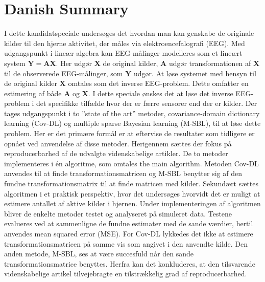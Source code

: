 \chapter*{Danish Summary}
I dette kandidatspeciale undersøges det hvordan man kan genskabe de originale kilder til den hjerne aktivitet, der måles via elektroencefalografi (EEG). Med udgangspunkt i lineær algebra kan EEG-målinger modelleres som et lineært system $\mathbf{Y}=\mathbf{AX}$. 
Her udgør $\mathbf{X}$ de original kilder, $\mathbf{A}$ udgør transformationen af $\mathbf{X}$ til de observerede EEG-målinger, som $\mathbf{Y}$ udgør.   
At løse systemet med hensyn til de original kilder $\mathbf{X}$ omtales som det inverse EEG-problem. 
Dette omfatter en estimering af både $\mathbf{A}$ og $\mathbf{X}$.
I dette speciale ønskes det at løse det inverse EEG-problem i det specifikke tilfælde hvor der er færre sensorer end der er kilder.  
Der tages udgangspunkt i to ”state of the art” metoder, covariance-domain dictionary learning (Cov-DL) og multiple sparse Bayesian learning (M-SBL), til at løse dette problem. 
Her er det primære formål er at eftervise de resultater som tidligere er opnået ved anvendelse af disse metoder. Herigennem sættes der fokus på reproducerbarhed af de udvalgte videnskabelige artikler.  
De to metoder implementeres i én algoritme, som omtales the main algorithm. 
Metoden Cov-DL anvendes til at finde transformationsmatricen og M-SBL benytter sig af den fundne transformationsmatrix til at finde matricen med kilder. 
Sekundært sættes algoritmen i et praktisk perspektiv, hvor det undersøges hvorvidt det er muligt at estimere antallet af aktive kilder i hjernen.
Under implementeringen af algoritmen bliver de enkelte metoder testet og analyseret på simuleret data. 
Testene evalueres ved at sammenligne de fundne estimater med de sande værdier, hertil anvendes mean squared error (MSE). 
For Cov-DL lykkedes det ikke at estimere transformationsmatricen på samme vis som angivet i den anvendte kilde.
Den anden metode, M-SBL, ses at være succesfuld når den sande transformationsmatrice benyttes. 
Herfra kan det konkluderes, at den tilsvarende videnskabelige artikel tilvejebragte en tilstrækkelig grad af reproducerbarhed.

